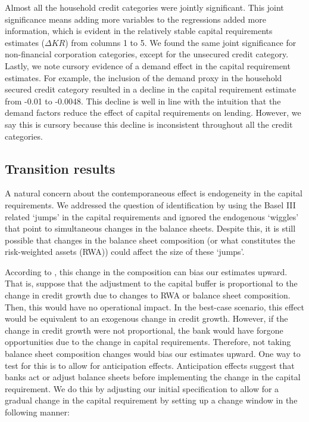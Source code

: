 \documentclass[
]{article}
\begin{document}
Almost all the household credit categories were jointly significant. This joint significance means adding more variables to the regressions added more information, which is evident in the relatively stable capital requirements estimates (\(\Delta KR\)) from columns 1 to 5. We found the same joint significance for non-financial corporation categories, except for the unsecured credit category. Lastly, we note cursory evidence of a demand effect in the capital requirement estimates. For example, the inclusion of the demand proxy in the household secured credit category resulted in a decline in the capital requirement estimate from -0.01 to -0.0048. This decline is well in line with the intuition that the demand factors reduce the effect of capital requirements on lending. However, we say this is cursory because this decline is inconsistent throughout all the credit categories.

\hypertarget{transition-results}{%
\subsection{Transition results}\label{transition-results}}

A natural concern about the contemporaneous effect is endogeneity in the capital requirements. We addressed the question of identification by using the Basel III related `jumps' in the capital requirements and ignored the endogenous `wiggles' that point to simultaneous changes in the balance sheets. Despite this, it is still possible that changes in the balance sheet composition (or what constitutes the risk-weighted assets (RWA)) could affect the size of these `jumps'.

According to \citet{fang2020bank}, this change in the composition can bias our estimates upward. That is, suppose that the adjustment to the capital buffer is proportional to the change in credit growth due to changes to RWA or balance sheet composition. Then, this would have no operational impact. In the best-case scenario, this effect would be equivalent to an exogenous change in credit growth. However, if the change in credit growth were not proportional, the bank would have forgone opportunities due to the change in capital requirements. Therefore, not taking balance sheet composition changes would bias our estimates upward. One way to test for this is to allow for anticipation effects. Anticipation effects suggest that banks act or adjust balance sheets before implementing the change in the capital requirement. We do this by adjusting our initial specification to allow for a gradual change in the capital requirement by setting up a change window in the following manner:
\end{document}
